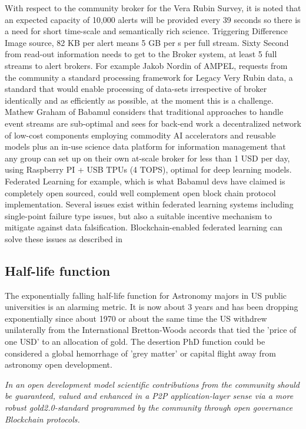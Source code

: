 \documentclass[final,5p,times,twocolumn,authoryear]{elsarticle}
\begin{document}
With respect to the community broker for the Vera Rubin Survey, it is noted that an expected capacity of 10,000 alerts will be provided every 39 seconds so there is a need for short time-scale and semantically rich science. Triggering Difference Image source, 82 KB per alert means 5 GB per s per full stream. Sixty Second from read-out information needs to get to the Broker system, at least 5 full streams to alert brokers.   For example  Jakob Nordin of AMPEL, requests from the community a standard processing framework for Legacy Very Rubin data, a standard that would enable processing of data-sets irrespective of broker identically and as efficiently as possible, at the moment this is a challenge.  Mathew Graham of Babamul considers that traditional approaches to handle event streams are sub-optimal and sees for back-end work a decentralized network of low-cost components employing commodity AI accelerators and reusable models plus an in-use science data platform for information management that any group can set up on their own at-scale broker for less than 1 USD per day, using Raspberry PI + USB TPUs (4 TOPS), optimal for deep learning models.  Federated Learning for example, which is what Babamul devs have claimed is completely open sourced, could well complement open block chain protocol implementation. Several issues exist within federated learning systems including single-point failure type issues, but also a suitable incentive mechanism to mitigate against data falsification. Blockchain-enabled federated learning can solve these issues as described in \cite{zhu2023} 


\subsection{Half-life function}
\label{btc2:sec:sub:half}

The exponentially falling half-life function for Astronomy majors in US public universities is an alarming metric. It is now about 3 years and has been dropping exponentially since about 1970 or about the same time the US withdrew unilaterally from the International Bretton-Woods accords that tied the 'price of one USD' to an allocation of gold. The desertion PhD function could be considered a global hemorrhage of 'grey matter' or capital flight away from astronomy open development.

\emph{In an open development model scientific contributions from the community should be guaranteed, valued and enhanced in a P2P application-layer sense via a more robust gold2.0-standard programmed by the community through open governance Blockchain protocols.}
\end{document}
